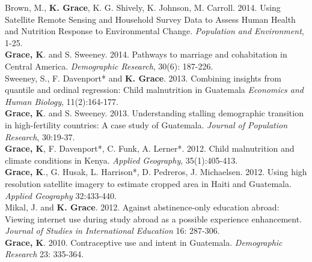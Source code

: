 \documentclass[11pt]{article} %
\begin{document}
\noindent
Brown, M., \textbf{K. Grace}, K.  G. Shively, K. Johnson, M. Carroll. 2014. Using Satellite Remote Sensing and Household Survey Data to Assess Human Health and Nutrition Response to Environmental Change. \textit{Population and Environment}, 1-25.\\


\noindent
\textbf{Grace, K}. and S. Sweeney. 2014.  Pathways to marriage and cohabitation in Central America.  \textit{Demographic Research}, 30(6): 187-226.\\

\noindent
Sweeney, S., F. Davenport* and \textbf{K. Grace}. 2013. Combining insights from quantile and ordinal regression: Child malnutrition in Guatemala  \textit{Economics and Human Biology}, 11(2):164-177.\\

\noindent
\textbf{Grace, K}. and S. Sweeney. 2013. Understanding stalling demographic transition in high-fertility countries: A case study of Guatemala.  \textit{Journal of Population Research}, 30:19-37. \\

\noindent
\textbf{Grace, K}, F. Davenport*, C. Funk, A. Lerner*. 2012. Child malnutrition and climate conditions in Kenya. \textit{Applied Geography}, 35(1):405-413. \\


\noindent
\textbf{Grace, K}., G. Husak, L. Harrison*, D. Pedreros, J. Michaelsen. 2012. Using high resolution satellite imagery to estimate cropped area in Haiti and Guatemala. \textit{Applied Geography} 32:433-440.\\


\noindent
Mikal, J. and \textbf{K. Grace}. 2012.  Against abstinence-only education abroad: Viewing internet use during study abroad as a possible experience enhancement. \textit{Journal of Studies in International Education} 16: 287-306.\\

\noindent
\textbf{Grace, K}. 2010. Contraceptive use and intent in Guatemala.  \textit{Demographic Research} 23: 335-364.\\






\end{document}
